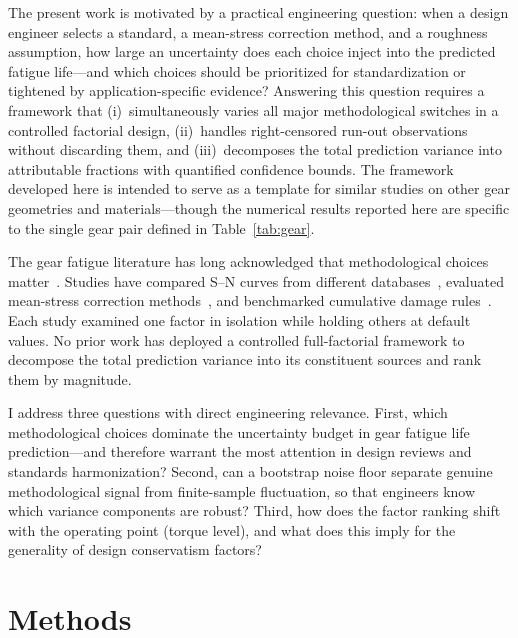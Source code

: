 \documentclass[12pt,a4paper]{article}
\begin{document}
The present work is motivated by a practical engineering question:
when a design engineer selects a standard, a mean-stress correction
method, and a roughness assumption, how large an uncertainty does each
choice inject into the predicted fatigue life---and which choices
should be prioritized for standardization or tightened by
application-specific evidence? Answering this question requires a
framework that (i)~simultaneously varies all major methodological
switches in a controlled factorial design, (ii)~handles right-censored
run-out observations without discarding them, and (iii)~decomposes the
total prediction variance into attributable fractions with quantified
confidence bounds. The framework developed here is intended to serve as
a template for similar studies on other gear geometries and
materials---though the numerical results reported here are specific
to the single gear pair defined in Table~\ref{tab:gear}.

The gear fatigue literature has long acknowledged that methodological
choices matter~\cite{stephens2001, dowling2013}. Studies have compared
S--N curves from different databases~\cite{waterloo_fde}, evaluated
mean-stress correction methods~\cite{dowling2009}, and benchmarked
cumulative damage rules~\cite{fatemi1998}. Each study examined one
factor in isolation while holding others at default values. No prior
work has deployed a controlled full-factorial framework to decompose
the total prediction variance into its constituent sources and rank
them by magnitude.

I address three questions with direct engineering relevance. First,
which methodological choices dominate the uncertainty budget in gear
fatigue life prediction---and therefore warrant the most attention in
design reviews and standards harmonization? Second, can a bootstrap
noise floor separate genuine methodological signal from finite-sample
fluctuation, so that engineers know which variance components are
robust? Third, how does the factor ranking shift with the operating
point (torque level), and what does this imply for the generality of
design conservatism factors?

\section{Methods}
\label{sec:methods}
\end{document}
